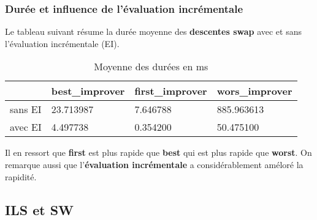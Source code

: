 \subsubsection{Durée et influence de l'évaluation incrémentale}
Le tableau suivant résume la durée moyenne des \textbf{descentes swap} avec et sans l'évaluation incrémentale (EI).
\begin{table}[ht]
	\centering
	\caption{Moyenne des durées en ms}
	\begin{tabular}[t]
		{m{}m{}m{}m{} }
		\toprule
		&best\_improver&	first\_improver&	wors\_improver\\
		\midrule
		sans EI &		23.713987&	7.646788&	885.963613\\
		avec EI &		4.497738& 0.354200 &	50.475100\\
		
		\bottomrule
	\end{tabular}
\end{table}

Il en ressort que \textbf{first} est plus rapide que \textbf{best} qui est plus rapide que \textbf{worst}. On remarque aussi que l'\textbf{évaluation incrémentale} a considérablement améloré la rapidité. 


\subsection{ILS et SW}

